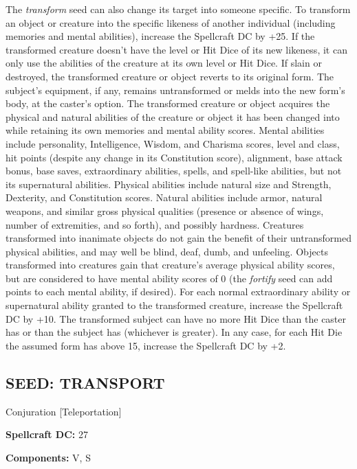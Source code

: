 \documentclass{article}
\begin{document}
The \textit{transform }seed can also change its target into someone specific. To 
transform an object or creature into the specific likeness of another individual 
(including memories and mental abilities), increase the Spellcraft DC by +25. If 
the transformed creature doesn't have the level or Hit Dice of its new likeness, 
it can only use the abilities of the creature at its own level or Hit Dice. If 
slain or destroyed, the transformed creature or object reverts to its original 
form. The subject's equipment, if any, remains untransformed or melds into the 
new form's body, at the caster's option. The transformed creature or object acquires 
the physical and natural abilities of the creature or object it has been changed 
into while retaining its own memories and mental ability scores. Mental abilities 
include personality, Intelligence, Wisdom, and Charisma scores, level and class, 
hit points (despite any change in its Constitution score), alignment, base attack 
bonus, base saves, extraordinary abilities, spells, and spell-like abilities, but 
not its supernatural abilities. Physical abilities include natural size and Strength, 
Dexterity, and Constitution scores. Natural abilities include armor, natural weapons, 
and similar gross physical qualities (presence or absence of wings, number of extremities, 
and so forth), and possibly hardness. Creatures transformed into inanimate objects 
do not gain the benefit of their untransformed physical abilities, and may well 
be blind, deaf, dumb, and unfeeling. Objects transformed into creatures gain that 
creature's average physical ability scores, but are considered to have mental ability 
scores of 0 (the \textit{fortify }seed can add points to each mental ability, if 
desired). For each normal extraordinary ability or supernatural ability granted 
to the transformed creature, increase the Spellcraft DC by +10. The transformed 
subject can have no more Hit Dice than the caster has or than the subject has (whichever 
is greater). In any case, for each Hit Die the assumed form has above 15, increase 
the Spellcraft DC by +2. 

\vspace{12pt}
\subsection*{SEED: TRANSPORT }

Conjuration [Teleportation] 

\textbf{Spellcraft DC:} 27 

\textbf{Components:} V, S 
\end{document}
